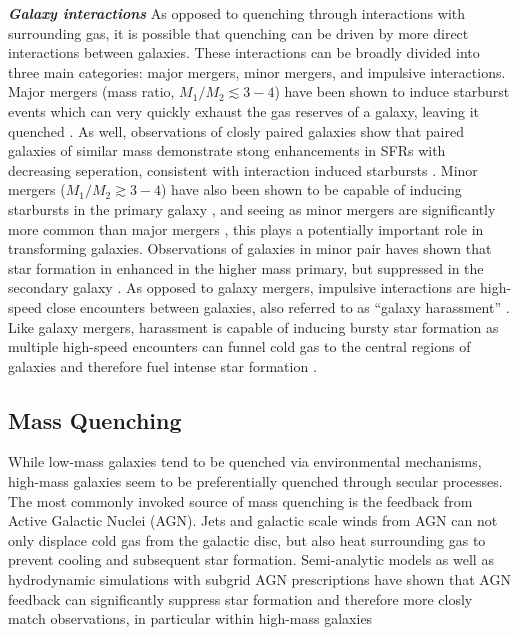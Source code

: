 \noindent \textit{\textbf{Galaxy interactions}}
\smallskip
\newline
As opposed to quenching through interactions with surrounding gas, it
is possible that quenching can be driven by more direct interactions
between galaxies.  These interactions can be broadly divided into
three main categories: major mergers, minor mergers, and impulsive
interactions.  Major mergers (mass ratio, $M_1/M_2 \lesssim 3-4$) have
been shown to induce starburst events which can very quickly exhaust the gas
reserves of a galaxy, leaving it quenched \citep[e.g.][]{mihos1994b}.
As well, observations of closly paired galaxies show that paired
galaxies of similar mass demonstrate stong enhancements in SFRs with
decreasing seperation, consistent with interaction induced starbursts
\citep{ellison2008, davies2015}.  Minor mergers ($M_1/M_2 \gtrsim
3-4$) have also been shown to be capable of inducing starbursts in the
primary galaxy \citep[e.g.][]{mihos1994a}, and seeing as minor mergers
are significantly more common than major mergers \citep{lotz2011},
this plays a potentially important role in transforming galaxies.
Observations of galaxies in minor pair haves shown that star formation
in enhanced in the higher mass primary, but suppressed in the
secondary galaxy \citep{davies2015}.  As opposed to galaxy mergers,
impulsive interactions are high-speed close encounters between
galaxies, also referred to as ``galaxy harassment'' \citep{moore1996}.
Like galaxy mergers, harassment is capable of inducing bursty star
formation as multiple high-speed encounters can funnel cold gas to the
central regions of galaxies and therefore fuel intense star formation
\citep{fujita1998}.  

\subsection{Mass Quenching}
\label{mass_quench}

While low-mass galaxies tend to be quenched via environmental
mechanisms, high-mass galaxies seem to be preferentially quenched
through secular processes.  The most commonly invoked source of mass
quenching is the feedback from Active Galactic Nuclei (AGN).  Jets and
galactic scale winds from AGN can not only displace cold gas from the
galactic disc, but also heat surrounding gas to prevent cooling and
subsequent star formation.  Semi-analytic models as well as
hydrodynamic simulations with subgrid AGN prescriptions have shown
that AGN feedback can significantly suppress star formation and
therefore more closly match observations, in
particular within high-mass galaxies \citep[e.g.][]{somerville2008,
  dubois2013, bongiorno2016}

%


